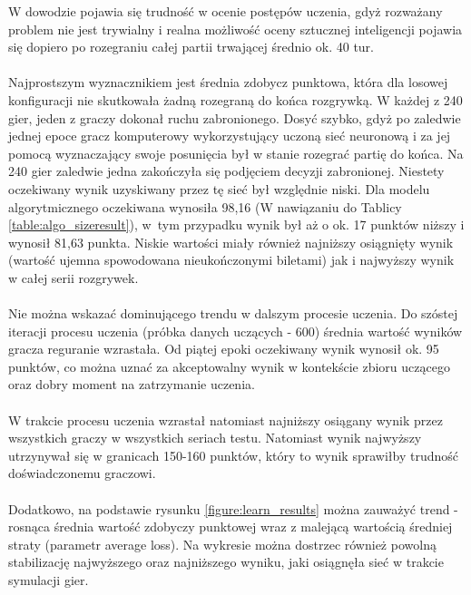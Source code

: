 \documentclass[12pt, oneside]{report}
\begin{document}
W dowodzie pojawia się trudność w ocenie postępów uczenia, gdyż rozważany problem nie jest trywialny i realna możliwość oceny sztucznej inteligencji pojawia się dopiero po rozegraniu całej partii trwającej średnio ok. 40 tur. \\ \\
Najprostszym wyznacznikiem jest średnia zdobycz punktowa, która dla losowej konfiguracji nie skutkowała żadną rozegraną do końca rozgrywką. W każdej z 240 gier, jeden z graczy dokonał ruchu zabronionego. Dosyć szybko, gdyż po zaledwie jednej epoce gracz komputerowy wykorzystujący uczoną sieć neuronową i za jej pomocą wyznaczający swoje posunięcia był w stanie rozegrać partię do końca. Na 240 gier zaledwie jedna zakończyła się podjęciem decyzji zabronionej. Niestety oczekiwany wynik uzyskiwany przez tę sieć był względnie niski. Dla modelu algorytmicznego oczekiwana wynosiła 98,16 (W nawiązaniu do Tablicy \ref{table:algo_sizeresult}), w~tym przypadku wynik był aż o ok. 17 punktów niższy i wynosił 81,63 punkta. Niskie wartości miały również najniższy osiągnięty wynik (wartość ujemna spowodowana nieukończonymi biletami) jak i najwyższy wynik w całej serii rozgrywek. \\ \\
Nie można wskazać dominującego trendu w dalszym procesie uczenia. Do szóstej iteracji procesu uczenia (próbka danych uczących - 600) średnia wartość wyników gracza reguranie wzrastała. Od piątej epoki oczekiwany wynik wynosił ok. 95 punktów, co można uznać za akceptowalny wynik w kontekście zbioru uczącego oraz dobry moment na zatrzymanie uczenia.
\\ \\ W trakcie procesu uczenia wzrastał natomiast najniższy osiągany wynik przez wszystkich graczy w wszystkich seriach testu. Natomiast wynik najwyższy utrzynywał się w granicach 150-160 punktów, który to wynik sprawiłby trudność doświadczonemu graczowi. \\ \\
Dodatkowo, na podstawie rysunku \ref{figure:learn_results} można zauważyć trend - rosnąca średnia wartość zdobyczy punktowej wraz z malejącą wartością średniej straty (parametr average loss). Na wykresie można dostrzec również powolną stabilizację najwyższego oraz najniższego wyniku, jaki osiągnęła sieć w trakcie symulacji gier.
\end{document}

